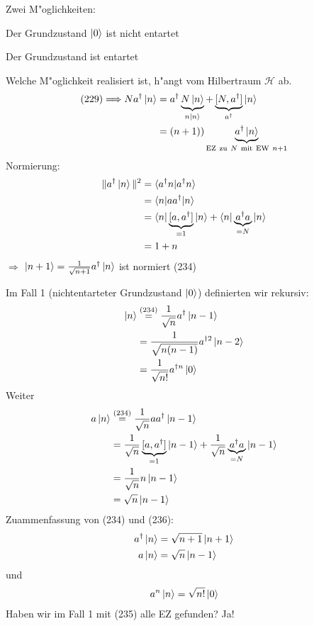 \documentclass[a4paper]{scrartcl}
\begin{document}
{Zwei M"oglichkeiten:
\begin{1aufz}
\item Der Grundzustand $\ket 0$ ist nicht entartet
\item Der Grundzustand ist entartet
\end{1aufz}
Welche M"oglichkeit realisiert ist, h"angt vom Hilbertraum $\mathcal H$ ab.
\begin{align*}
(229) \Longrightarrow N a^\dagger \ket n & = a^\dagger \underbrace{ N \ket n }_{n \ket n} + \underbrace{ [N, a^\dagger]}_{a^\dagger} \ket n \\
& = (n+1))\underbrace{ a^\dagger \ket n}_{\mathrm{EZ \ zu \ } N \mathrm{ \ mit \ EW \ } n+1}
\end{align*}
Normierung:
\begin{align*}
\Vert a^\dagger \ket n \Vert^2 & = \braket { a^\dagger n | a^\dagger n} \\
&  = \braket { n | a a^\dagger | n } \\
& = \braket{ n | \underbrace{ [ a, a^\dagger]}_{=1} | n } + \braket{ n | \underbrace{ a^\dagger a }_{=N} | n } \\
& = 1+n
\end{align*}
$\Longrightarrow$ $\ket {n+1} = \frac1{\sqrt{n+1}} a^\dagger \ket n $ ist normiert \hfill (234)
\setcounter{equation}{234}

Im Fall 1 (nichtentarteter Grundzustand $\ket 0$) definierten wir rekursiv:
\begin{align}
\begin{split}
\ket n & \stackrel{(234)}= \frac 1 {\sqrt{n}} a^\dagger \ket {n-1} \\
& = \frac 1 {\sqrt{n (n-1)}} a^{\dagger 2} \ket {n-2} \\
& = \frac1 {\sqrt{n!}} a^{\dagger n } \ket 0
\end{split}
\end{align}
Weiter
\begin{align}
\begin{split}
a \ket n & \stackrel{(234)}= \frac 1 {\sqrt n} a a^\dagger \ket{n-1} \\
& = \frac 1{\sqrt n } \underbrace{ [a, a^\dagger]}_{=1} \ket{n-1} + \frac 1 {\sqrt{n}} \underbrace{ a^\dagger a}_{=N} \ket{n-1} \\
& = \frac 1{\sqrt{n}} n \ket{n-1} \\
& = \sqrt n \ket{n-1}
\end{split}
\end{align}
Zuammenfassung von (234) und (236):
\begin{align}
\begin{split}
a^\dagger \ket n & = \sqrt{ n+1} \ket{n+1} \\
a \ket n & = \sqrt n \ket {n-1}
\end{split}
\end{align}
und
\begin{align}
a^n \ket n = \sqrt{n!} \ket 0
\end{align}
Haben wir im Fall 1 mit (235) alle EZ gefunden? Ja!

}
\end{document}
